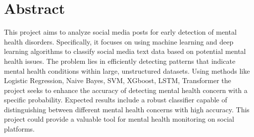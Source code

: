 

\section*{Abstract} 




\noindent
This project aims to analyze social media posts for early detection of mental health disorders. Specifically, it focuses on using machine learning and deep learning algorithms to classify social media text data based on potential mental health issues. The problem lies in efficiently detecting patterns that indicate mental health conditions within large, unstructured datasets. Using methods like Logistic Regression, Naive Bayes, SVM, XGboost, LSTM, Transformer the project seeks to enhance the accuracy of detecting mental health concern with a specific probability. Expected results include a robust classifier capable of distinguishing between different mental health concerns with high accuracy. This project could provide a valuable tool for mental health monitoring on social platforms.

